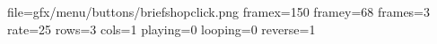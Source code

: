 file=gfx/menu/buttons/briefshopclick.png
framex=150
framey=68
frames=3
rate=25
rows=3
cols=1
playing=0
looping=0
reverse=1